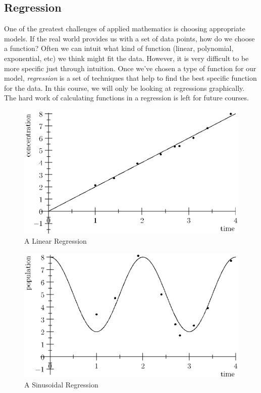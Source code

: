 \documentclass[fleqn]{report}
\begin{document}
\subsection{Regression}
\label{regression}

One of the greatest challenges of applied mathematics is
choosing appropriate models. If the real world provides us
with a set of data points, how do we choose a function?
Often we can intuit what kind of function (linear, polynomial,
exponential, etc) we think might fit the data. However, it is
very difficult to be more specific just through intuition.
Once we've chosen a type of function for our model,
\emph{regression} is a set of techniques that help to find the
best specific function for the data.  In this course, we will
only be looking at regressions graphically. The hard work of
calculating functions in a regression is left for future
courses. 

\begin{figure}[t]
\centering
\includegraphics[width=12cm]{figure37.eps}
\caption{A Linear Regression}
\label{figure-linear-regression}
\end{figure}

\begin{figure}[t]
\centering
\includegraphics[width=12cm]{figure38.eps}
\caption{A Sinusoidal Regression}
\label{figure-sinusoidal-regression}
\end{figure}
\end{document}
